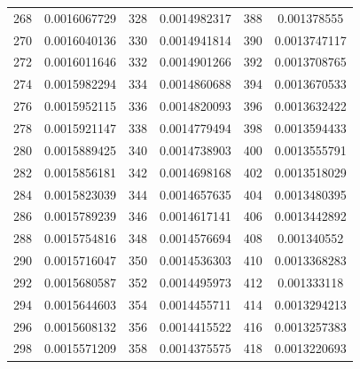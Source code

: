 \documentclass[
	12pt,				%
	openright,			%
	twoside,			%
	a4paper,			%
	english,			%
	french,				%
	spanish,			%
	brazil,				%
	]{abntex2}
\begin{document}
\begin{apendicesenv}
\begin{table}[H]
\begin{tabular}{c c| c c | c c}
268 & 0.0016067729 & 328 & 0.0014982317 & 388 & 0.001378555\\
270 & 0.0016040136 & 330 & 0.0014941814 & 390 & 0.0013747117\\
272 & 0.0016011646 & 332 & 0.0014901266 & 392 & 0.0013708765\\
274 & 0.0015982294 & 334 & 0.0014860688 & 394 & 0.0013670533\\
276 & 0.0015952115 & 336 & 0.0014820093 & 396 & 0.0013632422\\
278 & 0.0015921147 & 338 & 0.0014779494 & 398 & 0.0013594433\\
280 & 0.0015889425 & 340 & 0.0014738903 & 400 & 0.0013555791\\
282 & 0.0015856181 & 342 & 0.0014698168 & 402 & 0.0013518029\\
284 & 0.0015823039 & 344 & 0.0014657635 & 404 & 0.0013480395\\
286 & 0.0015789239 & 346 & 0.0014617141 & 406 & 0.0013442892\\
288 & 0.0015754816 & 348 & 0.0014576694 & 408 & 0.001340552\\
290 & 0.0015716047 & 350 & 0.0014536303 & 410 & 0.0013368283\\
292 & 0.0015680587 & 352 & 0.0014495973 & 412 & 0.001333118\\
294 & 0.0015644603 & 354 & 0.0014455711 & 414 & 0.0013294213\\
296 & 0.0015608132 & 356 & 0.0014415522 & 416 & 0.0013257383\\
298 & 0.0015571209 & 358 & 0.0014375575 & 418 & 0.0013220693
\end{tabular}
\end{table}

\newpage


\end{apendicesenv}
\end{document}
